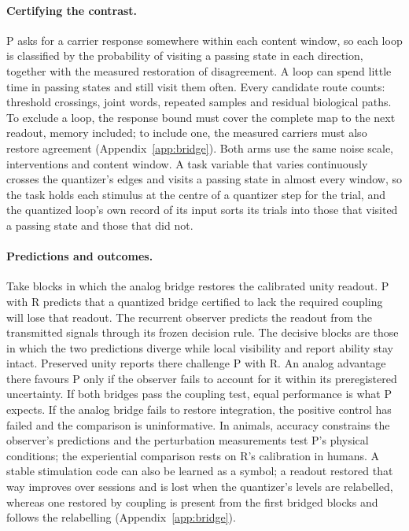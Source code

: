 \documentclass[12pt]{article}
\begin{document}
\paragraph{Certifying the contrast.} P asks for a carrier response somewhere
within each content window, so each loop is classified by the probability of
visiting a passing state in each direction, together with the measured
restoration of disagreement. A loop can spend little time in passing states and
still visit them often. Every candidate route counts: threshold crossings,
joint words, repeated samples and residual biological paths. To exclude a loop,
the response bound must cover the complete map to the next readout, memory
included; to include one, the measured carriers must also restore agreement
(Appendix~\ref{app:bridge}). Both arms use the same noise scale, interventions
and content window. A task variable that varies continuously crosses the
quantizer's edges and visits a passing state in almost every window, so the
task holds each stimulus at the centre of a quantizer step for the trial, and
the quantized loop's own record of its input sorts its trials into those that
visited a passing state and those that did not.

\paragraph{Predictions and outcomes.} Take blocks in which the analog bridge
restores the calibrated unity readout. P with R predicts that a quantized
bridge certified to lack the required coupling will lose that readout. The
recurrent observer predicts the readout from the transmitted signals through
its frozen decision rule. The decisive blocks are those in which the two
predictions diverge while local visibility and report ability stay intact.
Preserved unity reports there challenge P with R. An analog advantage there
favours P only if the observer fails to account for it within its
preregistered uncertainty. If both bridges pass the coupling test, equal
performance is what P expects. If the analog bridge fails to restore
integration, the positive control has failed and the comparison is
uninformative. In animals, accuracy constrains the observer's predictions and
the perturbation measurements test P's physical conditions; the experiential
comparison rests on R's calibration in humans. A stable stimulation code can
also be learned as a symbol; a readout restored that way improves over sessions
and is lost when the quantizer's levels are relabelled, whereas one restored by
coupling is present from the first bridged blocks and follows the relabelling
(Appendix~\ref{app:bridge}).
\end{document}
